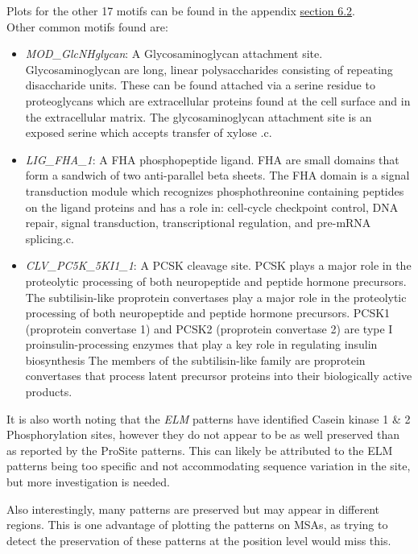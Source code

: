 \documentclass[10pt,twocolumn,letterpaper]{article}
\begin{document}
Plots for the other 17 motifs can be found in the appendix \hyperref[sec:elm_motifs]{section 6.2}. \\

Other common motifs found are:

\begin{itemize}
\item \textit{MOD\_GlcNHglycan}: A Glycosaminoglycan attachment site. 
Glycosaminoglycan are long, linear polysaccharides consisting of repeating disaccharide units. These can be found attached  via a serine residue to proteoglycans which are extracellular proteins found at the cell surface and in the extracellular matrix. The glycosaminoglycan attachment site is an exposed serine which accepts transfer of xylose .c.
\item \textit{LIG\_FHA\_1}: A FHA phosphopeptide ligand. FHA are small domains that form a sandwich of two anti-parallel beta sheets. The FHA domain is a signal transduction module which recognizes phosphothreonine containing peptides on the ligand proteins and has a role in: cell-cycle checkpoint control, DNA repair, signal transduction, transcriptional regulation, and pre-mRNA splicing.c.

\item \textit{CLV\_PC5K\_5KI1\_1}: A PCSK cleavage site. PCSK plays a major role in the proteolytic processing of both neuropeptide and peptide hormone precursors.
The subtilisin-like proprotein convertases play a major role in the proteolytic processing of both neuropeptide and peptide hormone precursors.
PCSK1 (proprotein convertase 1) and PCSK2 (proprotein convertase 2) are type I proinsulin-processing enzymes that play a key role in regulating insulin biosynthesis
The members of the subtilisin-like family are proprotein convertases that process latent precursor proteins into their biologically active products. 

\end{itemize}


It is also worth noting that the \textit{ELM} patterns have identified Casein kinase 1 \& 2 Phosphorylation sites, however they do not appear to be as well preserved than as reported by the ProSite patterns. This can likely be attributed to the ELM patterns being too specific and not accommodating sequence variation in the site, but more investigation is needed.

Also interestingly, many patterns are preserved but may appear in different regions. This is one advantage of plotting the patterns on MSAs, as trying to detect the preservation of these patterns at the position level would miss this.
\end{document}
